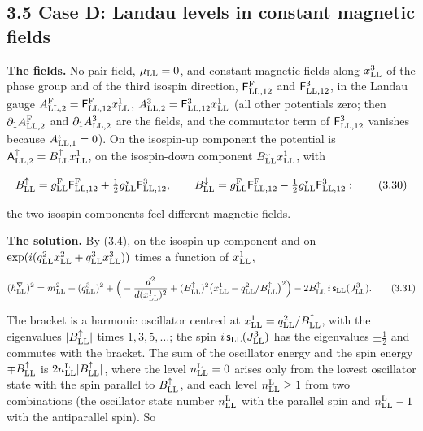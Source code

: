 \documentclass[
  10pt,
]{article}
\begin{document}
\hypertarget{case-d-landau-levels-in-constant-magnetic-fields}{%
\subsection{3.5 Case D: Landau levels in constant magnetic
fields}\label{case-d-landau-levels-in-constant-magnetic-fields}}

\textbf{The fields.} No pair field, \(\mu_{\rm LL}=0\), and constant
magnetic fields along \(x^3_{\rm LL}\) of the phase group and of the
third isospin direction, \(\mathsf F^{\rm F}_{{\rm LL},12}\) and
\(\mathsf F^3_{{\rm LL},12}\), in the Landau gauge
\(A^{\rm F}_{{\rm LL},2}=\mathsf F^{\rm F}_{{\rm LL},12}x^1_{\rm LL}\),
\(A^3_{{\rm LL},2}=\mathsf F^3_{{\rm LL},12}x^1_{\rm LL}\) (all other
potentials zero; then \(\partial_1A^{\rm F}_{{\rm LL},2}\) and
\(\partial_1A^3_{{\rm LL},2}\) are the fields, and the commutator term
of \(\mathsf F^3_{{\rm LL},12}\) vanishes because
\(A^\iota_{{\rm LL},1}=0\)). On the isospin-up component the potential
is \(\mathsf A^\uparrow_{{\rm LL},2}=B^\uparrow_{\rm LL}x^1_{\rm LL}\),
on the isospin-down component \(B^\downarrow_{\rm LL}x^1_{\rm LL}\),
with

\[B^\uparrow_{\rm LL}=g^{\rm F}_{\rm LL}\mathsf F^{\rm F}_{{\rm LL},12}+\tfrac12g^{\rm v}_{\rm LL}\mathsf F^3_{{\rm LL},12},\qquad B^\downarrow_{\rm LL}=g^{\rm F}_{\rm LL}\mathsf F^{\rm F}_{{\rm LL},12}-\tfrac12g^{\rm v}_{\rm LL}\mathsf F^3_{{\rm LL},12}:\tag{3.30}\]

the two isospin components feel different magnetic fields.

\textbf{The solution.} By (3.4), on the isospin-up component and on
\(\exp(i(q^2_{\rm LL}x^2_{\rm LL}+q^3_{\rm LL}x^3_{\rm LL}))\) times a
function of \(x^1_{\rm LL}\),

\[(h^\nabla_{\rm LL})^2=m_{\rm LL}^2+(q^3_{\rm LL})^2+\Big(-\frac{d^2}{d(x^1_{\rm LL})^2}+(B^\uparrow_{\rm LL})^2\big(x^1_{\rm LL}-q^2_{\rm LL}/B^\uparrow_{\rm LL}\big)^2\Big)-2B^\uparrow_{\rm LL}\,i\,\mathsf s_{\rm LL}(J^3_{\rm LL}).\tag{3.31}\]

The bracket is a harmonic oscillator centred at
\(x^1_{\rm LL}=q^2_{\rm LL}/B^\uparrow_{\rm LL}\), with the eigenvalues
\(\lvert B^\uparrow_{\rm LL}\rvert\) times \(1,3,5,\dots\); the spin
\(i\,\mathsf s_{\rm LL}(J^3_{\rm LL})\) has the eigenvalues
\(\pm\tfrac12\) and commutes with the bracket. The sum of the oscillator
energy and the spin energy \(\mp B^\uparrow_{\rm LL}\) is
\(2n^{\rm L}_{\rm LL}\lvert B^\uparrow_{\rm LL}\rvert\), where the level
\(n^{\rm L}_{\rm LL}=0\) arises only from the lowest oscillator state
with the spin parallel to \(B^\uparrow_{\rm LL}\), and each level
\(n^{\rm L}_{\rm LL}\ge1\) from two combinations (the oscillator state
number \(n^{\rm L}_{\rm LL}\) with the parallel spin and
\(n^{\rm L}_{\rm LL}-1\) with the antiparallel spin). So
\end{document}
